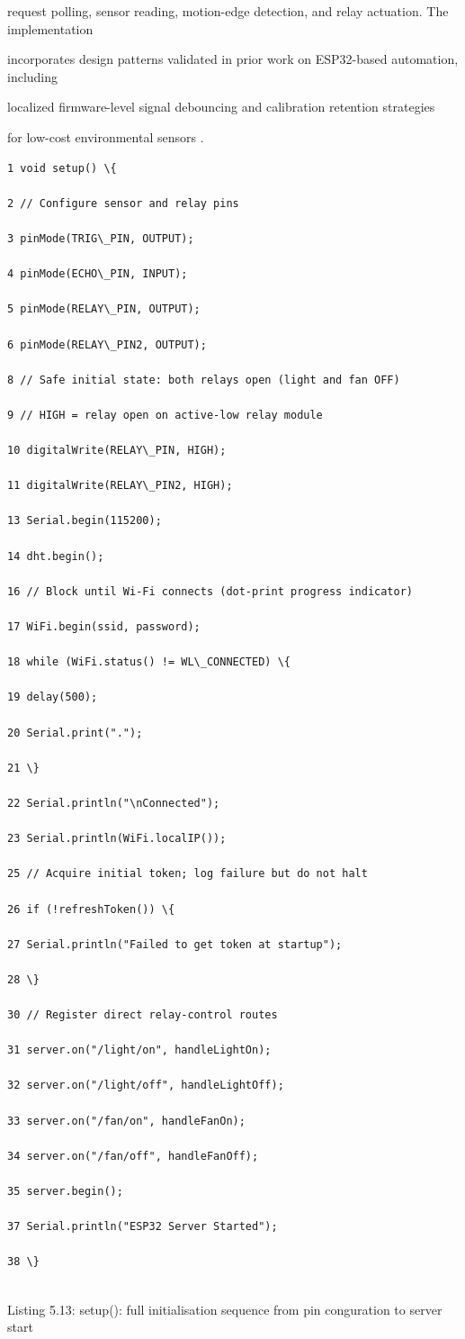 request polling, sensor reading, motion-edge detection, and relay actuation. The implementation

incorporates design patterns validated in prior work on ESP32-based automation, including

localized firmware-level signal debouncing \cite{silva2024} and calibration retention strategies

for low-cost environmental sensors \cite{thompson2024}.

\begin{listingbox}
	\begin{verbatim}
1 void setup() \{

2 // Configure sensor and relay pins

3 pinMode(TRIG\_PIN, OUTPUT);

4 pinMode(ECHO\_PIN, INPUT);

5 pinMode(RELAY\_PIN, OUTPUT);

6 pinMode(RELAY\_PIN2, OUTPUT);

8 // Safe initial state: both relays open (light and fan OFF)

9 // HIGH = relay open on active-low relay module

10 digitalWrite(RELAY\_PIN, HIGH);

11 digitalWrite(RELAY\_PIN2, HIGH);

13 Serial.begin(115200);

14 dht.begin();

16 // Block until Wi-Fi connects (dot-print progress indicator)

17 WiFi.begin(ssid, password);

18 while (WiFi.status() != WL\_CONNECTED) \{

19 delay(500);

20 Serial.print(".");

21 \}

22 Serial.println("\nConnected");

23 Serial.println(WiFi.localIP());

25 // Acquire initial token; log failure but do not halt

26 if (!refreshToken()) \{

27 Serial.println("Failed to get token at startup");

28 \}

30 // Register direct relay-control routes

31 server.on("/light/on", handleLightOn);

32 server.on("/light/off", handleLightOff);

33 server.on("/fan/on", handleFanOn);

34 server.on("/fan/off", handleFanOff);

35 server.begin();

37 Serial.println("ESP32 Server Started");

38 \}


\end{verbatim}
\end{listingbox}
Listing 5.13: setup(): full initialisation sequence from pin conguration to server start

